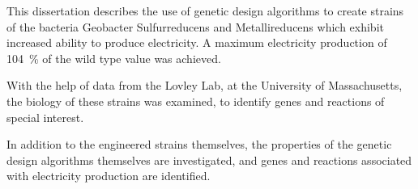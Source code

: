 This dissertation describes the use of genetic design algorithms to create strains of the bacteria Geobacter Sulfurreducens and Metallireducens which exhibit increased ability to produce electricity. 
A maximum electricity production of \SI{104}{\percent} of the wild type value was achieved.

With the help of data from the Lovley Lab, at the University of Massachusetts, the biology of these strains was examined, to identify genes and reactions of special interest.

In addition to the engineered strains themselves, the properties of the genetic design algorithms themselves are investigated, and genes and reactions associated with electricity production are identified.